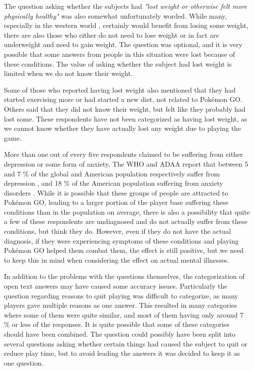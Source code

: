 The question asking whether the subjects had \emph{"lost weight or otherwise felt more physically healthy"} was also somewhat unfortunately worded. While many, especially in the western world \cite{NIDDKoverweight}\cite{WHOobesity}, certainly would benefit from losing some weight, there are also those who either do not need to lose weight or in fact are underweight and need to gain weight. The question was optional, and it is very possible that some answers from people in this situation were lost because of these conditions. The value of asking whether the subject had lost weight is limited when we do not know their weight.

Some of those who reported having lost weight also mentioned that they had started exercising more or had started a new diet, not related to Pokémon GO. Others said that they did not know their weight, but felt like they probably had lost some. These respondents have not been categorized as having lost weight, as we cannot know whether they have actually lost any weight due to playing the game.

More than one out of every five respondents claimed to be suffering from either depression or some form of anxiety. The WHO and ADAA report that between 5 and 7 \% of the global and American population respectively suffer from depression \cite{ADAAdepression}\cite{WHOdepression}, and 18 \% of the American population suffering from anxiety disorders \cite{ADAAanxiety}. While it is possible that these groups of people are attracted to Pokémon GO, leading to a larger portion of the player base suffering these conditions than in the population on average, there is also a possibility that quite a few of these respondents are undiagnosed and do not actually suffer from these conditions, but think they do. However, even if they do not have the actual diagnosis, if they were experiencing symptoms of these conditions and playing Pokémon GO helped them combat them, the effect is still positive, but we need to keep this in mind when considering the effect on actual mental illnesses.

In addition to the problems with the questions themselves, the categorization of open text answers may have caused some accuracy issues. Particularly the question regarding reasons to quit playing was difficult to categorize, as many players gave multiple reasons as one answer. This resulted in many categories where some of them were quite similar, and most of them having only around 7 \% or less of the responses. It is quite possible that some of these categories should have been combined. The question could possibly have been split into several questions asking whether certain things had caused the subject to quit or reduce play time, but to avoid leading the answers it was decided to keep it as one question.

